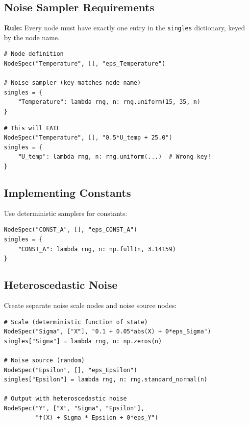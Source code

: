 \documentclass[11pt,a4paper]{article}
\begin{document}
\subsection{Noise Sampler Requirements}

\textbf{Rule:} Every node must have exactly one entry in the \texttt{singles} dictionary, keyed by the node name.

\begin{lstlisting}[caption={Correct Pattern}]
# Node definition
NodeSpec("Temperature", [], "eps_Temperature")

# Noise sampler (key matches node name)
singles = {
    "Temperature": lambda rng, n: rng.uniform(15, 35, n)
}
\end{lstlisting}

\begin{lstlisting}[caption={Incorrect Pattern - Multiple noise symbols}]
# This will FAIL
NodeSpec("Temperature", [], "0.5*U_temp + 25.0")
singles = {
    "U_temp": lambda rng, n: rng.uniform(...)  # Wrong key!
}
\end{lstlisting}

\subsection{Implementing Constants}

Use deterministic samplers for constants:

\begin{lstlisting}
NodeSpec("CONST_A", [], "eps_CONST_A")
singles = {
    "CONST_A": lambda rng, n: np.full(n, 3.14159)
}
\end{lstlisting}

\subsection{Heteroscedastic Noise}

Create separate noise scale nodes and noise source nodes:

\begin{lstlisting}
# Scale (deterministic function of state)
NodeSpec("Sigma", ["X"], "0.1 + 0.05*abs(X) + 0*eps_Sigma")
singles["Sigma"] = lambda rng, n: np.zeros(n)

# Noise source (random)
NodeSpec("Epsilon", [], "eps_Epsilon")
singles["Epsilon"] = lambda rng, n: rng.standard_normal(n)

# Output with heteroscedastic noise
NodeSpec("Y", ["X", "Sigma", "Epsilon"],
         "f(X) + Sigma * Epsilon + 0*eps_Y")
\end{lstlisting}
\end{document}
